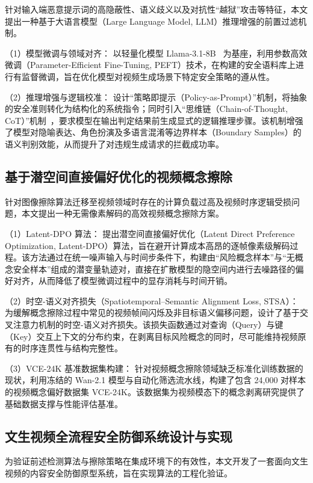 针对输入端恶意提示词的高隐蔽性、语义歧义以及对抗性“越狱”攻击等特征，本文提出一种基于大语言模型（Large Language Model, LLM）推理增强的前置过滤机制。

（1）模型微调与领域对齐： 以轻量化模型 Llama-3.1-8B ~\cite{dubey2024llama}为基座，利用参数高效微调（Parameter-Efficient Fine-Tuning, PEFT）技术，在构建的安全语料库上进行有监督微调，旨在优化模型对视频生成场景下特定安全策略的遵从性。

（2）推理增强与逻辑校准： 设计“策略即提示（Policy-as-Prompt）”机制，将抽象的安全准则转化为结构化的系统指令；同时引入“思维链（Chain-of-Thought, CoT）”机制~\cite{wei2022chain}，要求模型在输出判定结果前生成显式的逻辑推理步骤。该机制增强了模型对隐喻表达、角色扮演及多语言混淆等边界样本（Boundary Samples）的语义判别效能，从而提升了对违规生成请求的拦截成功率。

\subsection{基于潜空间直接偏好优化的视频概念擦除}

针对图像擦除算法迁移至视频领域时存在的计算负载过高及视频时序逻辑受损问题，本文提出一种无需像素解码的高效视频概念擦除方案。

（1）Latent-DPO 算法： 提出潜空间直接偏好优化（Latent Direct Preference Optimization, Latent-DPO）算法，旨在避开计算成本高昂的逐帧像素级解码过程。该方法通过在统一噪声输入与时间步条件下，构建由“风险概念样本”与“无概念安全样本”组成的潜变量轨迹对，直接在扩散模型的隐空间内进行去噪路径的偏好对齐，从而降低了模型微调过程中的显存消耗与时间开销。

（2）时空-语义对齐损失（Spatiotemporal–Semantic Alignment Loss, STSA）： 为缓解概念擦除过程中常见的视频帧间闪烁及非目标语义偏移问题，设计了基于交叉注意力机制的时空-语义对齐损失。该损失函数通过对查询（Query）与键（Key）交互上下文的分布约束，在剥离目标风险概念的同时，尽可能维持视频原有的时序连贯性与结构完整性。

（3）VCE-24K 基准数据集构建： 针对视频概念擦除领域缺乏标准化训练数据的现状，利用冻结的 Wan-2.1 模型与自动化筛选流水线，构建了包含 24,000 对样本的视频概念偏好数据集 VCE-24K。该数据集为视频模态下的概念剥离研究提供了基础数据支撑与性能评估基准。

\subsection{文生视频全流程安全防御系统设计与实现}

为验证前述检测算法与擦除策略在集成环境下的有效性，本文开发了一套面向文生视频的内容安全防御原型系统，旨在实现算法的工程化验证。

